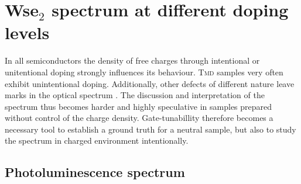 \section{Ws\textup{e}$_2$ spectrum at different doping levels}

In all semiconductors the density of free charges through intentional or unitentional doping strongly influences its behaviour. \textsc{Tmd} samples very often exhibit unintentional doping\cite{kang_origin_2017, eshun_doping_2015}. Additionally, other defects of different nature leave marks in the optical spectrum \cite{chow_defect-induced_2015,lin_defect_2016}. The discussion and interpretation of the spectrum thus becomes harder and highly speculative in samples prepared without control of the charge density. Gate-tunabillity therefore becomes a necessary tool to establish a ground truth for a neutral sample, but also to study the spectrum in charged environment intentionally.

\subsection{Photoluminescence spectrum}

